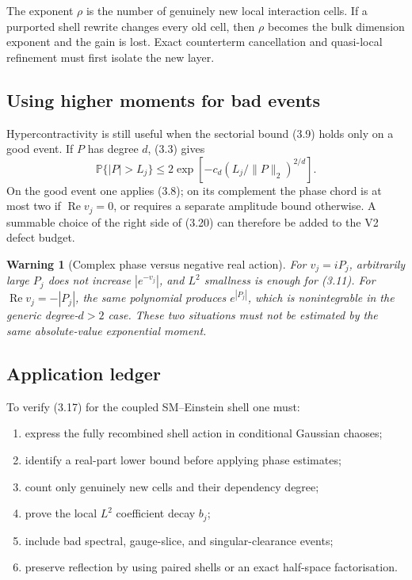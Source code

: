 \documentclass[11pt]{article}
\newtheorem{warning}[theorem]{Warning}
\theoremstyle{remark}
\begin{document}
The exponent \(\rho\) is the number of genuinely new local
interaction cells.  If a purported shell rewrite changes every old
cell, then \(\rho\) becomes the bulk dimension exponent and the gain
is lost.  Exact counterterm cancellation and quasi-local refinement
must first isolate the new layer.

\subsection{Using higher moments for bad events}

Hypercontractivity is still useful when the sectorial bound (3.9)
holds only on a good event.  If \(P\) has degree \(d\), (3.3) gives
\[
 \mathbb P\{|P|>L_j\}
 \le2\exp\left[-c_d
       (L_j/\|P\|_2)^{2/d}\right].                           \tag{3.20}
\]
On the good event one applies (3.8); on its complement the phase chord
is at most two if \(\operatorname{Re}v_j=0\), or requires a separate
amplitude bound otherwise.  A summable choice of the right side of
(3.20) can therefore be added to the V2 defect budget.

\begin{warning}[Complex phase versus negative real action]
\label{warn:v12v3-phase}
For \(v_j=iP_j\), arbitrarily large \(P_j\) does not increase
\(|e^{-v_j}|\), and \(L^2\) smallness is enough for (3.11).
For \(\operatorname{Re}v_j=-|P_j|\), the same polynomial produces
\(e^{|P_j|}\), which is nonintegrable in the generic degree-\(d>2\)
case.  These two situations must not be estimated by the same
absolute-value exponential moment.
\end{warning}

\subsection{Application ledger}

To verify (3.17) for the coupled SM--Einstein shell one must:
\begin{enumerate}
\item express the fully recombined shell action in conditional
      Gaussian chaoses;
\item identify a real-part lower bound before applying phase
      estimates;
\item count only genuinely new cells and their dependency degree;
\item prove the local \(L^2\) coefficient decay \(b_j\);
\item include bad spectral, gauge-slice, and singular-clearance events;
\item preserve reflection by using paired shells or an exact
      half-space factorisation.
\end{enumerate}
\end{document}
